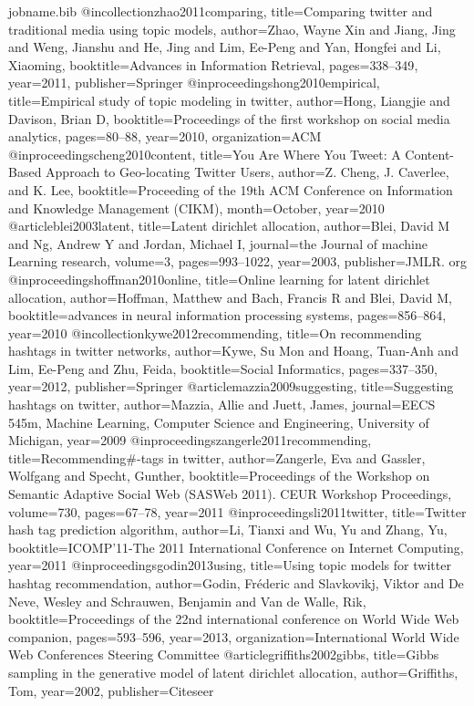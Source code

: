 \documentclass{acm_proc_article-sp}
\begin{document}
\begin{filecontents}{jobname.bib}
@incollection{zhao2011comparing,
	title={Comparing twitter and traditional media using topic models},
	author={Zhao, Wayne Xin and Jiang, Jing and Weng, Jianshu and He, Jing and Lim, Ee-Peng and Yan, Hongfei and Li, Xiaoming},
	booktitle={Advances in Information Retrieval},
	pages={338--349},
	year={2011},
	publisher={Springer}
}
@inproceedings{hong2010empirical,
	title={Empirical study of topic modeling in twitter},
	author={Hong, Liangjie and Davison, Brian D},
	booktitle={Proceedings of the first workshop on social media analytics},
	pages={80--88},
	year={2010},
	organization={ACM}
}
@inproceedings{cheng2010content,
	title={You Are Where You Tweet: A Content-Based Approach to Geo-locating Twitter Users},
	author={Z. Cheng, J. Caverlee, and K. Lee},
	booktitle={Proceeding of the 19th ACM Conference on Information and Knowledge Management (CIKM)},
	month={October},
	year={2010}
}
@article{blei2003latent,
	title={Latent dirichlet allocation},
	author={Blei, David M and Ng, Andrew Y and Jordan, Michael I},
	journal={the Journal of machine Learning research},
	volume={3},
	pages={993--1022},
	year={2003},
	publisher={JMLR. org}
}
@inproceedings{hoffman2010online,
	title={Online learning for latent dirichlet allocation},
	author={Hoffman, Matthew and Bach, Francis R and Blei, David M},
	booktitle={advances in neural information processing systems},
	pages={856--864},
	year={2010}
}
@incollection{kywe2012recommending,
	title={On recommending hashtags in twitter networks},
	author={Kywe, Su Mon and Hoang, Tuan-Anh and Lim, Ee-Peng and Zhu, Feida},
	booktitle={Social Informatics},
	pages={337--350},
	year={2012},
	publisher={Springer}
}
@article{mazzia2009suggesting,
	title={Suggesting hashtags on twitter},
	author={Mazzia, Allie and Juett, James},
	journal={EECS 545m, Machine Learning, Computer Science and Engineering, University of Michigan},
	year={2009}
}
@inproceedings{zangerle2011recommending,
	title={Recommending\#-tags in twitter},
	author={Zangerle, Eva and Gassler, Wolfgang and Specht, Gunther},
	booktitle={Proceedings of the Workshop on Semantic Adaptive Social Web (SASWeb 2011). CEUR Workshop Proceedings},
	volume={730},
	pages={67--78},
	year={2011}
}
@inproceedings{li2011twitter,
	title={Twitter hash tag prediction algorithm},
	author={Li, Tianxi and Wu, Yu and Zhang, Yu},
	booktitle={ICOMP’11-The 2011 International Conference on Internet Computing},
	year={2011}
}
@inproceedings{godin2013using,
	title={Using topic models for twitter hashtag recommendation},
	author={Godin, Fr{\'e}deric and Slavkovikj, Viktor and De Neve, Wesley and Schrauwen, Benjamin and Van de Walle, Rik},
	booktitle={Proceedings of the 22nd international conference on World Wide Web companion},
	pages={593--596},
	year={2013},
	organization={International World Wide Web Conferences Steering Committee}
}
@article{griffiths2002gibbs,	
	title={Gibbs sampling in the generative model of latent dirichlet allocation},
	author={Griffiths, Tom},
	year={2002},
	publisher={Citeseer}
}
\end{filecontents}

\nocite{*}




\end{document}
